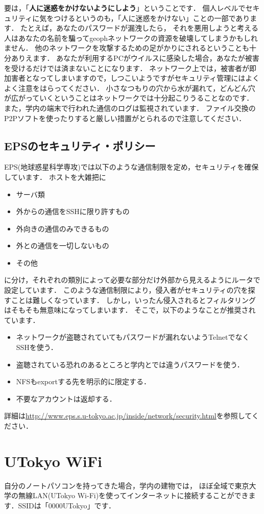 \documentclass{jarticle}
\begin{document}
要は，「{\bf 人に迷惑をかけないようにしよう}」ということです．
個人レベルでセキュリティに気をつけるというのも，「人に迷惑をかけない」ことの一部であります．
たとえば，あなたのパスワードが漏洩したら，
それを悪用しようと考える人はあなたの名前を騙ってgeophネットワークの資源を破壊してしまうかもしれません．
他のネットワークを攻撃するための足がかりにされるということも十分ありえます．
あなたが利用するPCがウイルスに感染した場合，あなたが被害を受けるだけでは済まないことになります．
ネットワーク上では，被害者が即加害者となってしまいますので，しつこいようですがセキュリティ管理にはよくよく注意をはらってください．
小さなつもりの穴から水が漏れて，どんどん穴が広がっていくということはネットワークでは十分起こりうることなのです．
また，学内の端末で行われた通信のログは監視されています．
ファイル交換のP2Pソフトを使ったりすると厳しい措置がとられるので注意してください．

\newpage
\subsection{EPSのセキュリティ・ポリシー}
EPS(地球惑星科学専攻)では以下のような通信制限を定め，セキュリティを確保しています． ホストを大雑把に
\begin{itemize}
\item サーバ類
\item 外からの通信をSSHに限り許すもの
\item 外向きの通信のみできるもの
\item 外との通信を一切しないもの
\item その他
\end{itemize}
に分け，それぞれの類別によって必要な部分だけ外部から見えるようにルータで設定しています．
このような通信制限により，侵入者がセキュリティの穴を探すことは難しくなっています．
しかし，いったん侵入されるとフィルタリングはそもそも無意味になってしまいます．
そこで，以下のようなことが推奨されています．
\begin{itemize}
\item ネットワークが盗聴されていてもパスワードが漏れないようTelnetでなくSSHを使う．
\item 盗聴されている恐れのあるところと学内とでは違うパスワードを使う．
\item NFSもexportする先を明示的に限定する．
\item 不要なアカウントは返却する．
\end{itemize}
詳細は\url{http://www.eps.s.u-tokyo.ac.jp/inside/network/security.html}を参照してください．

\section{UTokyo WiFi}
自分のノートパソコンを持ってきた場合，学内の建物では，
ほぼ全域で東京大学の無線LAN(UTokyo Wi-Fi)を使ってインターネットに接続することができます．SSIDは「0000UTokyo」です．
\end{document}

